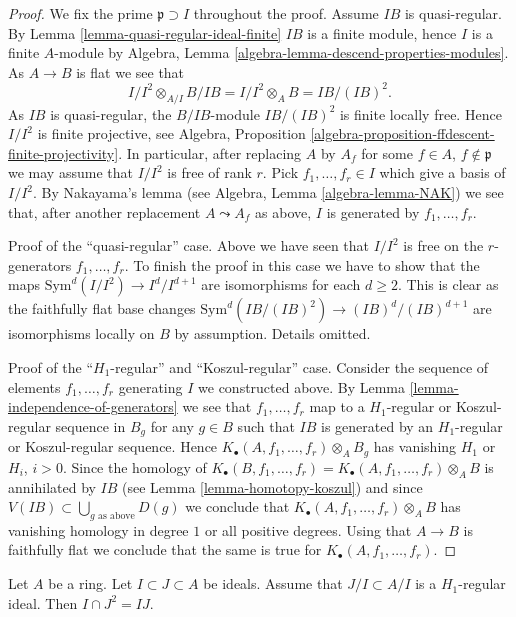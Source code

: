 \begin{proof}
We fix the prime $\mathfrak p \supset I$ throughout the proof.
Assume $IB$ is quasi-regular. By
Lemma \ref{lemma-quasi-regular-ideal-finite}
$IB$ is a finite module, hence $I$ is a finite $A$-module by
Algebra, Lemma \ref{algebra-lemma-descend-properties-modules}.
As $A \to B$ is flat we see that
$$
I/I^2 \otimes_{A/I} B/IB = I/I^2 \otimes_A B = IB/(IB)^2.
$$
As $IB$ is quasi-regular, the $B/IB$-module $IB/(IB)^2$ is finite
locally free. Hence $I/I^2$ is finite projective, see
Algebra, Proposition \ref{algebra-proposition-ffdescent-finite-projectivity}.
In particular, after replacing $A$ by $A_f$ for some
$f \in A$, $f \not \in \mathfrak p$ we may assume that $I/I^2$ is free of
rank $r$. Pick $f_1, \ldots, f_r \in I$ which
give a basis of $I/I^2$. By Nakayama's lemma (see
Algebra, Lemma \ref{algebra-lemma-NAK})
we see that, after another replacement $A \leadsto A_f$ as above,
$I$ is generated by $f_1, \ldots, f_r$.

\medskip\noindent
Proof of the ``quasi-regular'' case. Above we have seen that
$I/I^2$ is free on the $r$-generators $f_1, \ldots, f_r$.
To finish the proof in this case we have to show that the maps
$\text{Sym}^d(I/I^2) \to I^d/I^{d + 1}$ are isomorphisms
for each $d \geq 2$. This is clear as the faithfully flat
base changes $\text{Sym}^d(IB/(IB)^2) \to (IB)^d/(IB)^{d + 1}$
are isomorphisms locally on $B$ by assumption.
Details omitted.

\medskip\noindent
Proof of the ``$H_1$-regular'' and ``Koszul-regular'' case.
Consider the sequence of elements $f_1, \ldots, f_r$ generating
$I$ we constructed above. By
Lemma \ref{lemma-independence-of-generators}
we see that $f_1, \ldots, f_r$ map to a $H_1$-regular or Koszul-regular
sequence in $B_g$ for any $g \in B$ such that $IB$ is generated by
an $H_1$-regular or Koszul-regular sequence. Hence
$K_\bullet(A, f_1, \ldots, f_r) \otimes_A B_g$ has vanishing
$H_1$ or $H_i$, $i > 0$. Since the homology of
$K_\bullet(B, f_1, \ldots, f_r) = K_\bullet(A, f_1, \ldots, f_r) \otimes_A B$
is annihilated by $IB$ (see
Lemma \ref{lemma-homotopy-koszul})
and since $V(IB) \subset \bigcup_{g\text{ as above}} D(g)$ we conclude that
$K_\bullet(A, f_1, \ldots, f_r) \otimes_A B$ has vanishing homology in
degree $1$ or all positive degrees. Using that $A \to B$ is faithfully
flat we conclude that the same is true for
$K_\bullet(A, f_1, \ldots, f_r)$.
\end{proof}

\begin{lemma}
\label{lemma-conormal-sequence-H1-regular-ideal}
Let $A$ be a ring. Let $I \subset J \subset A$ be ideals.
Assume that $J/I \subset A/I$ is a $H_1$-regular ideal.
Then $I \cap J^2 = IJ$.
\end{lemma}

